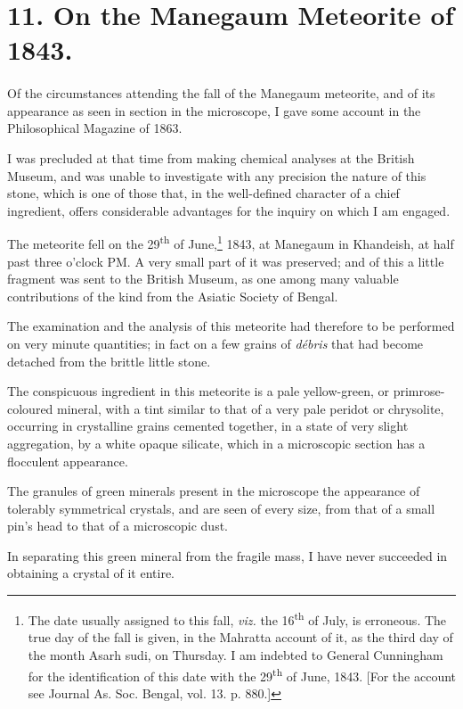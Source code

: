 \documentclass[a4paper, 12pt, oneside]{article}
\begin{document}
\section{11. On the Manegaum Meteorite of 1843.}
\paragraph{}
Of the circumstances attending the fall of the Manegaum meteorite, and of its appearance as seen in section in the microscope, I gave some account in the Philosophical Magazine of 1863.

I was precluded at that time from making chemical analyses at the British Museum, and was unable to investigate with any precision the nature of this stone, which is one of those that, in the well-defined character of a chief ingredient, offers considerable advantages for the inquiry on which I am engaged.

The meteorite fell on the 29\textsuperscript{th} of June,\footnote{The date usually assigned to this fall, \emph{viz.} the 16\textsuperscript{th} of July, is erroneous. The true day of the fall is given, in the Mahratta account of it, as the third day of the month Asarh sudi, on Thursday. I am indebted to General Cunningham for the identification of this date with the 29\textsuperscript{th} of June, 1843. [For the account see Journal As. Soc. Bengal, vol. 13. p. 880.]} 1843, at Manegaum in Khandeish, at half past three o'clock PM. A very small part of it was preserved; and of this a little fragment was sent to the British Museum, as one among many valuable contributions of the kind from the Asiatic Society of Bengal.

The examination and the analysis of this meteorite had therefore to be performed on very minute quantities; in fact on a few grains of \emph{débris} that had become detached from the brittle little stone.

The conspicuous ingredient in this meteorite is a pale yellow-green, or primrose-coloured mineral, with a tint similar to that of a very pale peridot or chrysolite, occurring in crystalline grains cemented together, in a state of very slight aggregation, by a white opaque silicate, which in a microscopic section has a flocculent appearance.

The granules of green minerals present in the microscope the appearance of tolerably symmetrical crystals, and are seen of every size, from that of a small pin's head to that of a microscopic dust.

In separating this green mineral from the fragile mass, I have never succeeded in obtaining a crystal of it entire.
\end{document}
